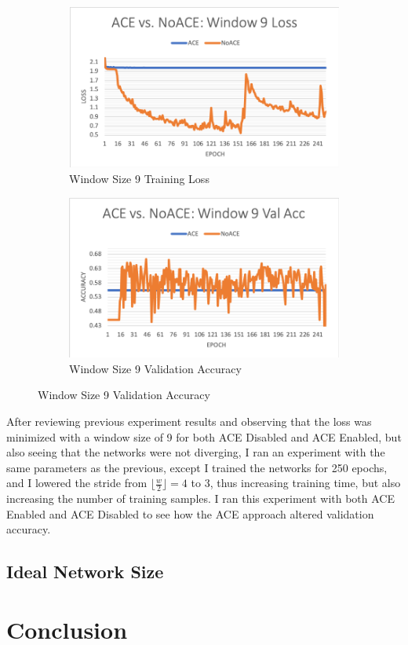 \documentclass[12pt]{article}
\begin{document}
\begin{figure}[t]
	\begin{subfigure}{0.45\linewidth}
		\includegraphics[width=\linewidth]{acevnoace-window9-loss.png}
		\caption{Window Size 9 Training Loss}
	\end{subfigure}
	\hfill
	\begin{subfigure}{0.45\linewidth}
		\includegraphics[width=\linewidth]{acevnoace-window9-valacc.png}
		\caption{Window Size 9 Validation Accuracy}		
	\end{subfigure}
	

\end{figure}


After reviewing previous experiment results and observing that the loss was minimized with a window size of 9 for both ACE Disabled and ACE Enabled, but also seeing that the networks were not diverging, I ran an experiment with the same parameters as the previous, except I trained the networks for 250 epochs, and I lowered the stride from $\lfloor\frac{w}{2}\rfloor = 4$ to 3, thus increasing training time, but also increasing the number of training samples. 
%
I ran this experiment with both ACE Enabled and ACE Disabled to see how the ACE approach altered validation accuracy. 
\subsection{Ideal Network Size}

\section{Conclusion}\label{sec:conclusion}


\newpage
 

\end{document}
